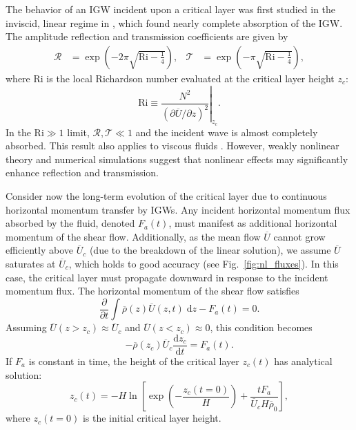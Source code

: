\documentclass[
        fleqn,
        usenatbib,
    ]{mnras}
\newcommand*{\rd}[2]{\frac{\mathrm{d}#1}{\mathrm{d}#2}}
\newcommand*{\pd}[2]{\frac{\partial#1}{\partial#2}}
\newcommand*{\pdil}[2]{\partial#1/\partial#2}
\newcommand*{\at}[1]{\left.#1\right|}
\newcommand*{\p}[1]{\left(#1\right)}
\newcommand*{\s}[1]{\left[#1\right]}
\begin{document}
The behavior of an IGW incident upon a critical layer was first studied in the
inviscid, linear regime in \citet{booker_bretherton}, which found nearly
complete absorption of the IGW\@. The amplitude
reflection and transmission coefficients are given by
\begin{align}
    \mathcal{R} &= \exp\p{-2\pi \sqrt{\mathrm{Ri} - \frac{1}{4}}}, &
    \mathcal{T} &= \exp\p{-\pi \sqrt{\mathrm{Ri} - \frac{1}{4}}},
        \label{eq:crit_coeffs}
\end{align}
where $\mathrm{Ri}$ is the local Richardson number evaluated at the critical
layer height $z_c$:
\begin{equation}
    \mathrm{Ri} \equiv \at{\frac{N^2}{\p{\pdil{\overline{U}}{z}}^2}}_{z_c}.
        \label{eq:ri_def}
\end{equation}
In the $\mathrm{Ri} \gg 1$ limit, $\mathcal{R}, \mathcal{T} \ll 1$ and the
incident wave is almost completely absorbed. This result also applies to viscous
fluids \citep{hazel}. However, weakly nonlinear theory \citep{brown_stewartson}
and numerical simulations \citep{winters1994} suggest that nonlinear effects may
significantly enhance reflection and transmission.

Consider now the long-term evolution of the critical layer due to continuous
horizontal momentum transfer by IGWs. \textcolor{Corr}{Any incident horizontal
momentum flux absorbed by the fluid, denoted $F_a(t)$, must manifest as
additional horizontal momentum of the shear flow}.
\textcolor{Corr}{Additionally, as the mean flow $\overline{U}$ cannot grow
efficiently above $\overline{U}_c$ (due to the breakdown of the linear
solution), we assume $\overline{U}$ saturates at $\overline{U}_c$, which holds
to good accuracy (see Fig.~\ref{fig:nl_fluxes}). In this case, the critical
layer must propagate downward in response to the incident momentum flux.} The
horizontal momentum of the shear flow satisfies
\begin{equation}
    \pd{}{t}\int\limits \overline{\rho}(z) \overline{U}(z, t)\;\mathrm{d}z
        - F_a(t) = 0.
\end{equation}
Assuming $\overline{U}(z > z_c) \approx \overline{U}_c$ and $\overline{U}(z <
z_c) \approx 0$, this condition becomes
\begin{equation}
    -\overline{\rho}(z_c) \overline{U}_c\rd{z_c}{t} = F_a(t).\label{eq:zc_anal}
\end{equation}
If $F_a$ is constant in time, the height of the critical layer $z_c(t)$ has
analytical solution:
\begin{equation}
    z_c(t) = -H\ln \s{\exp\p{-\frac{z_c(t = 0)}{H}} +
        \frac{tF_a}{\overline{U}_c H\overline{\rho}_0}},\label{eq:zc_sol}
\end{equation}
where $z_c(t = 0)$ is the initial critical layer height.
\end{document}

